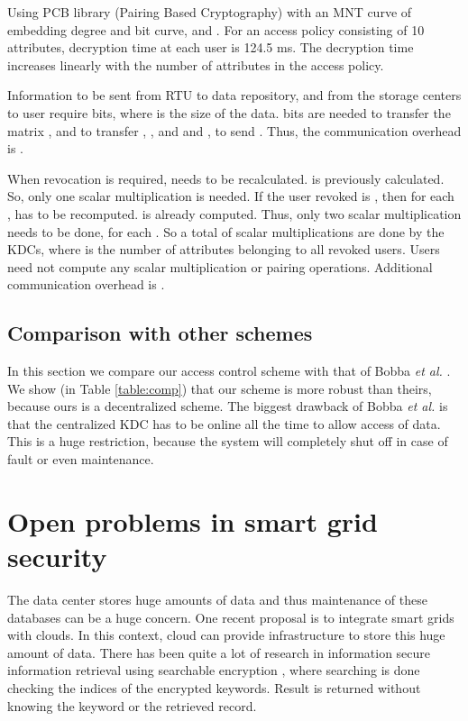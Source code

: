 \documentclass[conference]{IEEEtran}[10pt]
\begin{document}
Using PCB library (Pairing Based Cryptography) \cite{PBC} with an MNT curve of embedding degree  and  bit curve, 
 and . 
For an access policy consisting of 10 attributes, decryption time at each user is 124.5 ms. 
The decryption time increases linearly with the number of attributes in the access policy.   


Information to be sent from RTU to data repository, and from the storage centers  to user require
 bits, where  is the size of the data.
 bits are needed to transfer the matrix , and  to transfer , ,  and  and
, to send .
Thus, the communication overhead is .

When revocation is required,  needs to be recalculated.
 is previously calculated. So, only one scalar multiplication is needed.
If the user revoked is , then for each ,  has to be recomputed.
 is already computed. Thus, only two scalar multiplication needs to be done, for each .
So a total of  scalar multiplications are done by the KDCs, where  is the number of attributes  belonging to all revoked users.
Users need not compute any scalar multiplication or pairing operations.
Additional communication overhead is .




\subsection{Comparison with other schemes}
\label{subsec:comparison}
In this section we compare our access control scheme with that of Bobba \emph{et al.} \cite{BKAA09}. 
We show (in Table \ref{table:comp}) that our scheme is more robust than theirs, because ours is a decentralized scheme.
The biggest drawback of Bobba \emph{et al.} \cite{BKAA09} is that the centralized KDC has to be online
all the time to allow access of data. This is a huge restriction, 
because the system will completely shut off in case of fault or even maintenance. 



\section{Open problems in smart grid security}
\label{sec:open-problems}
The data center stores huge amounts of data and thus maintenance of these databases can be a huge concern. 
One recent proposal is to integrate smart grids with clouds. 
In this context, cloud can provide infrastructure to store this huge amount of data. 
There has been quite a lot of research in information secure information retrieval using searchable encryption \cite{SWP00,CGKO06},
where searching is done checking the indices of the encrypted keywords. Result is returned 
without knowing the keyword or the retrieved record. 
\end{document}
